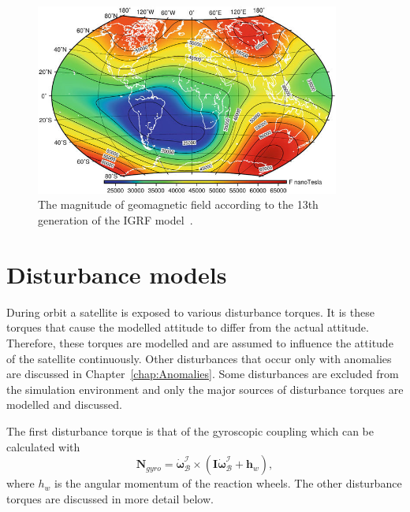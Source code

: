 \begin{figure}[!htb]
	\centering
	\includegraphics[width = 10cm]{Figures/IGRF-13th.png}
	\caption{The magnitude of geomagnetic field according to the 13th generation of the IGRF model~\cite{koskinen2022radiation}.}
	\label{fig:IGRF13th}
\end{figure}

\section{Disturbance models}
\label{section: disturbance models}
During orbit a satellite is exposed to various disturbance torques. It is these torques that cause the modelled attitude to differ from the actual attitude. Therefore, these torques are modelled and are assumed to influence the attitude of the satellite continuously. Other disturbances that occur only with anomalies are discussed in Chapter~\ref{chap:Anomalies}. Some disturbances are excluded from the simulation environment and only the major sources of disturbance torques are modelled and discussed.

The first disturbance torque is that of the gyroscopic coupling which can be calculated with
\begin{equation}
\mathbf{N}_{gyro} = \boldsymbol{\dot{\omega}}_\mathcal{B}^\mathcal{I} \times (\mathbf{I}\boldsymbol{\dot{\omega}}_\mathcal{B}^\mathcal{I} + \mathbf{h}_w),
\end{equation}
where $h_w$ is the angular momentum of the reaction wheels. The other disturbance torques are discussed in more detail below.

